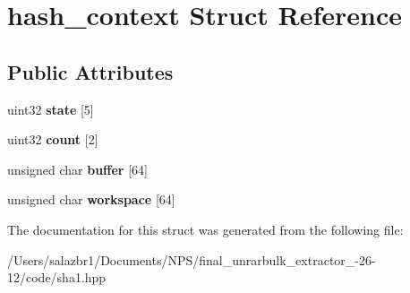 \hypertarget{structhash__context}{\section{hash\-\_\-context Struct Reference}
\label{structhash__context}
}
\subsection*{Public Attributes}
\begin{DoxyCompactItemize}
\item 
\hypertarget{structhash__context_ae741feeba04e89a487b7180198b98b27}{uint32 {\bfseries state} \mbox{[}5\mbox{]}}\label{structhash__context_ae741feeba04e89a487b7180198b98b27}

\item 
\hypertarget{structhash__context_ae0c487dd20545403d7ede0120b2a0891}{uint32 {\bfseries count} \mbox{[}2\mbox{]}}\label{structhash__context_ae0c487dd20545403d7ede0120b2a0891}

\item 
\hypertarget{structhash__context_a7ff05817f73a181740899409a638fd90}{unsigned char {\bfseries buffer} \mbox{[}64\mbox{]}}\label{structhash__context_a7ff05817f73a181740899409a638fd90}

\item 
\hypertarget{structhash__context_a9df344022f9410bdd8311791396735f6}{unsigned char {\bfseries workspace} \mbox{[}64\mbox{]}}\label{structhash__context_a9df344022f9410bdd8311791396735f6}

\end{DoxyCompactItemize}


The documentation for this struct was generated from the following file\-:\begin{DoxyCompactItemize}
\item 
/\-Users/salazbr1/\-Documents/\-N\-P\-S/final\-\_\-unrarbulk\-\_\-extractor\-\_-\/26-\/12/code/sha1.\-hpp\end{DoxyCompactItemize}
